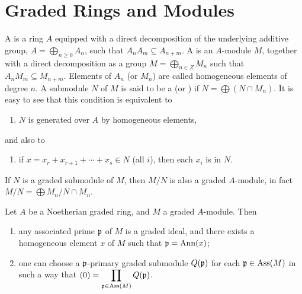 \documentclass[../main]{subfiles}
\begin{document}
\section{Graded Rings and Modules}\label{sec:10}

\newparagraph A  is a ring $A$ equipped with a direct decomposition of the underlying additive group, $A=\bigoplus_{n\geqslant0}A_n$, such that $A_nA_m\subseteq A_{n+m}$. A  is an $A$-module $M$, together with a direct decomposition as a group $M=\bigoplus_{n\in Z}M_n$ such that $A_nM_m\subseteq M_{n+m}$. Elements of $A_n$ (or $M_n$) are called homogeneous elements of degree $n$. A submodule $N$ of $M$ is said to be a  (or )  if $N = \bigoplus(N\cap M_n)$. It is easy to see that this condition is equivalent to 
\begin{enumerate}[label = (10.$*$), ref = cond:10.$*$]
    \item $N$ is generated over $A$ by homogeneous elements, 
\end{enumerate}
and also to 
\begin{enumerate}[label = (10.$**$), ref = cond:10.$**$]
    \item if $x = x_r + x_{r+1}+\cdots+x_s\in N$ (all $i$), then each $x_i$ is in $N$. 
\end{enumerate}

If $N$ is a graded submodule of $M$, then $M/N$ is also a graded $A$-module, in fact $M/N=\bigoplus M_n/N\cap M_n$.

\begin{parproposition}
Let $A$ be a Noetherian graded ring, and $M$ a graded $A$-module. Then
\begin{enumerate}[label=\roman*)]
    \item any associated prime $\mathfrak{p}$ of $M$ is a graded ideal, and there exists a homogeneous element $x$ of $M$ such that $\mathfrak{p}=\operatorname{Ann}(x)$;
    \item one can choose a $\mathfrak{p}$-primary graded submodule $Q(\mathfrak{p})$ for each $\mathfrak{p} \in \operatorname{Ass} (M)$ in such a way that $(0)=\displaystyle\prod_{\mathfrak{p} \in \operatorname{Ass}(M)} Q(\mathfrak{p})$.
\end{enumerate}
\end{parproposition}
\end{document}
